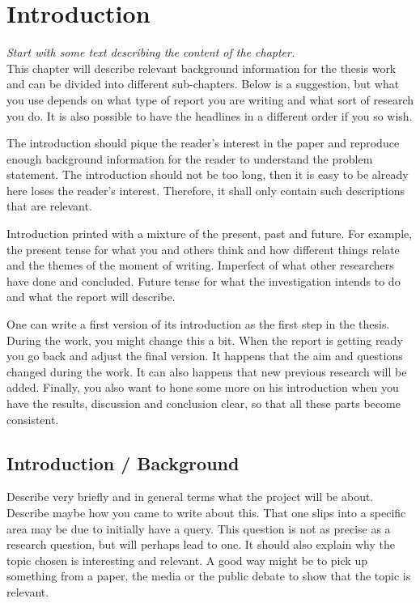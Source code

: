 \section{Introduction}


\emph{Start with some text describing the content of the chapter.}\\

\noindent This chapter will describe relevant background information for the thesis work and can be divided into different sub-chapters. Below is a suggestion, but what you use depends on what type of report you are writing and what sort of research you do. It is also possible to have the headlines in a different order if you so wish.

The introduction should pique the reader's interest in the paper and reproduce enough background information for the reader to understand the problem statement. The introduction should not be too long, then it is easy to be already here loses the reader's interest. Therefore, it shall only contain such descriptions that are relevant.

Introduction printed with a mixture of the present, past and future. For example, the present tense for what you and others think and how different things relate and the themes of the moment of writing. Imperfect of what other researchers have done and concluded. Future tense for what the investigation intends to do and what the report will describe.

One can write a first version of its introduction as the first step in the thesis. During the work, you might change this a bit. When the report is getting ready you go back and adjust the final version. It happens that the aim and questions changed during the work. It can also happens that new previous research will be added. Finally, you also want to hone some more on his introduction when you have the results, discussion and conclusion clear, so that all these parts become consistent.

\subsection{Introduction / Background}
Describe very briefly and in general terms what the project will be about. Describe maybe how you came to write about this. That one slips into a specific area may be due to initially have a query. This question is not as precise as a research question, but will perhaps lead to one. It should also explain why the topic chosen is interesting and relevant. A good way might be to pick up something from a paper, the media or the public debate to show that the topic is relevant.

